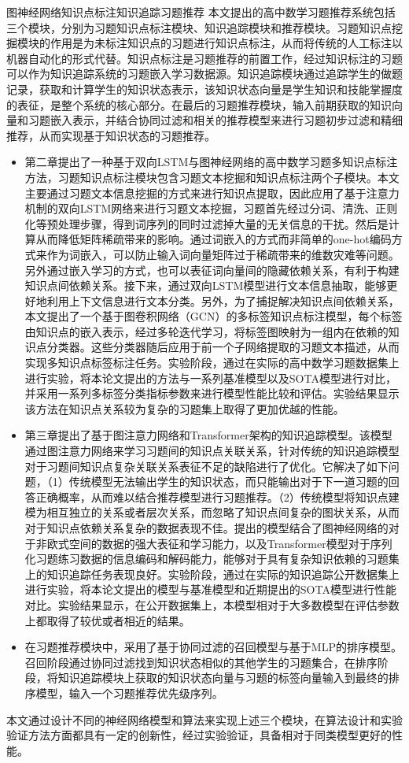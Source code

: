 \begin{abstractC}{图神经网络}{知识点标注}{知识追踪}{习题推荐}{}
    本文提出的高中数学习题推荐系统包括三个模块，分别为习题知识点标注模块、知识追踪模块和推荐模块。习题知识点挖掘模块的作用是为未标注知识点的习题进行知识点标注，从而将传统的人工标注以机器自动化的形式代替。知识点标注是习题推荐的前置工作，经过知识标注的习题可以作为知识追踪系统的习题嵌入学习数据源。知识追踪模块通过追踪学生的做题记录，获取和计算学生的知识状态表示，该知识状态向量是学生知识和技能掌握度的表征，是整个系统的核心部分。在最后的习题推荐模块，输入前期获取的知识向量和习题嵌入表示，并结合协同过滤和相关的推荐模型来进行习题初步过滤和精细推荐，从而实现基于知识状态的习题推荐。
    \begin{itemize}
        \item 第二章提出了一种基于双向LSTM与图神经网络的高中数学习题多知识点标注方法，习题知识点标注模块包含习题文本挖掘和知识点标注两个子模块。本文主要通过习题文本信息挖掘的方式来进行知识点提取，因此应用了基于注意力机制的双向LSTM网络来进行习题文本挖掘，习题首先经过分词、清洗、正则化等预处理步骤，得到词序列的同时过滤掉大量的无关信息的干扰。然后是计算从而降低矩阵稀疏带来的影响。通过词嵌入的方式而非简单的one-hot编码方式来作为词嵌入，可以防止输入词向量矩阵过于稀疏带来的维数灾难等问题。另外通过嵌入学习的方式，也可以表征词向量间的隐藏依赖关系，有利于构建知识点间依赖关系。接下来，通过双向LSTM模型进行文本信息抽取，能够更好地利用上下文信息进行文本分类。另外，为了捕捉解决知识点间依赖关系，本文提出了一个基于图卷积网络（GCN）的多标签知识点标注模型，每个标签由知识点的嵌入表示，经过多轮迭代学习，将标签图映射为一组内在依赖的知识点分类器。这些分类器随后应用于前一个子网络提取的习题文本描述，从而实现多知识点标签标注任务。实验阶段，通过在实际的高中数学习题数据集上进行实验，将本论文提出的方法与一系列基准模型以及SOTA模型进行对比，并采用一系列多标签分类指标参数来进行模型性能比较和评估。实验结果显示该方法在知识点关系较为复杂的习题集上取得了更加优越的性能。
        \item 第三章提出了基于图注意力网络和Transformer架构的知识追踪模型。该模型通过图注意力网络来学习习题间的知识点关联关系，针对传统的知识追踪模型对于习题间知识点复杂关联关系表征不足的缺陷进行了优化。它解决了如下问题，（1）传统模型无法输出学生的知识状态，而只能输出对于下一道习题的回答正确概率，从而难以结合推荐模型进行习题推荐。（2）传统模型将知识点建模为相互独立的关系或者层次关系，而忽略了知识点间复杂的图状关系，从而对于知识点依赖关系复杂的数据表现不佳。提出的模型结合了图神经网络的对于非欧式空间的数据的强大表征和学习能力，以及Transformer模型对于序列化习题练习数据的信息编码和解码能力，能够对于具有复杂知识依赖的习题集上的知识追踪任务表现良好。实验阶段，通过在实际的知识追踪公开数据集上进行实验，将本论文提出的模型与基准模型和近期提出的SOTA模型进行性能对比。实验结果显示，在公开数据集上，本模型相对于大多数模型在评估参数上都取得了较优或者相近的结果。
        \item 在习题推荐模块中，采用了基于协同过滤的召回模型与基于MLP的排序模型。召回阶段通过协同过滤找到知识状态相似的其他学生的习题集合，在排序阶段，将知识追踪模块上获取的知识状态向量与习题的标签向量输入到最终的排序模型，输入一个习题推荐优先级序列。
    \end{itemize}

    本文通过设计不同的神经网络模型和算法来实现上述三个模块，在算法设计和实验验证方法方面都具有一定的创新性，经过实验验证，具备相对于同类模型更好的性能。
\end{abstractC}
